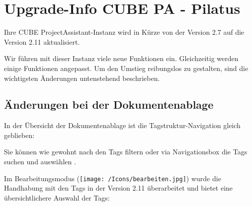 \section{Upgrade-Info CUBE PA - Pilatus} %

Ihre CUBE ProjectAssistant-Instanz wird in Kürze von der Version 2.7 auf die Version 2.11 aktualisiert.

\vspace{\baselineskip}

Wir führen mit dieser Instanz viele neue Funktionen ein. Gleichzeitig werden einige Funktionen angepasst. Um den Umstieg reibungslos zu gestalten, sind die wichtigsten Änderungen untenstehend beschrieben.

\subsection{Änderungen bei der Dokumentenablage} %

In der Übersicht der Dokumentenablage ist die Tagstruktur-Navigation gleich geblieben:

\begin{figure}[H]
\end{figure}

Sie können wie gewohnt nach den Tags filtern oder via Navigationsbox die Tags suchen und auswählen .

Im Bearbeitungsmodus (\texttt{[image: /Icons/bearbeiten.jpg]}) wurde die Handhabung mit den Tags in der Version 2.11 überarbeitet und bietet eine übersichtlichere Auswahl der Tags:

\begin{figure}[H]
\end{figure}

